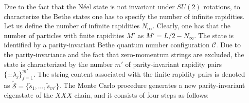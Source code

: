 \documentclass[11pt]{iopart}
\begin{document}
Due to the fact that the N\'eel state is not invariant under $SU(2)$ rotations, 
to characterize the Bethe states one has to specify the number of infinite rapidities. 
Let us define the number of infinite rapidities $N_{\infty}$. Clearly, one has that 
the number of particles with finite rapidities $M'$ as $M'=L/2-N_\infty$. 
The state is identified by a parity-invariant Bethe quantum number 
configuration ${\mathcal C}$. Due to the parity-invariance and the fact that zero-momentum 
strings are excluded, the state is characterized by the number $m'$ of parity-invariant 
rapidity pairs $\{\pm\lambda_j\}_{j=1}^{m'}$. The string content 
associated with the finite rapidity pairs is denoted as $\widetilde{\mathcal S}=
\{\tilde s_1,\dots,\tilde s_{m'}\}$. The Monte Carlo procedure generates a new 
parity-invariant eigenstate of the $XXX$ chain, and it consists of four steps as 
follows: 
%
\end{document}
